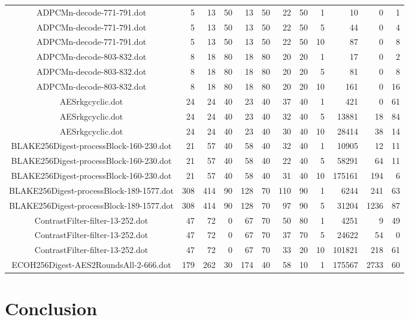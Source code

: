\documentclass[colorback,accentcolor=tud1c,11pt]{tudreport}
\begin{document}
\begin{landscape}
\begin{tabular}{ c | r | r | r | r | r | r | r | r | r | r | r }
   ADPCMn-decode-771-791.dot                &   5 &  13 & 50 &  13 & 50 &  22 & 50 &  1 &     10 &    0 &  1 \\
   ADPCMn-decode-771-791.dot                &   5 &  13 & 50 &  13 & 50 &  22 & 50 &  5 &     44 &    0 &  4 \\
   ADPCMn-decode-771-791.dot                &   5 &  13 & 50 &  13 & 50 &  22 & 50 & 10 &     87 &    0 &  8 \\
   ADPCMn-decode-803-832.dot                &   8 &  18 & 80 &  18 & 80 &  20 & 20 &  1 &     17 &    0 &  2 \\
   ADPCMn-decode-803-832.dot                &   8 &  18 & 80 &  18 & 80 &  20 & 20 &  5 &     81 &    0 &  8 \\
   ADPCMn-decode-803-832.dot                &   8 &  18 & 80 &  18 & 80 &  20 & 20 & 10 &    161 &    0 & 16 \\
   AESrkgcyclic.dot                         &  24 &  24 & 40 &  23 & 40 &  37 & 40 &  1 &    421 &    0 & 61 \\
   AESrkgcyclic.dot                         &  24 &  24 & 40 &  23 & 40 &  32 & 40 &  5 &  13881 &   18 & 84 \\
   AESrkgcyclic.dot                         &  24 &  24 & 40 &  23 & 40 &  30 & 40 & 10 &  28414 &   38 & 14 \\
   BLAKE256Digest-processBlock-160-230.dot  &  21 &  57 & 40 &  58 & 40 &  32 & 40 &  1 &  10905 &   12 & 11 \\
   BLAKE256Digest-processBlock-160-230.dot  &  21 &  57 & 40 &  58 & 40 &  22 & 40 &  5 &  58291 &   64 & 11 \\
   BLAKE256Digest-processBlock-160-230.dot  &  21 &  57 & 40 &  58 & 40 &  31 & 40 & 10 & 175161 &  194 &  6 \\
   BLAKE256Digest-processBlock-189-1577.dot & 308 & 414 & 90 & 128 & 70 & 110 & 90 &  1 &   6244 &  241 & 63 \\
   BLAKE256Digest-processBlock-189-1577.dot & 308 & 414 & 90 & 128 & 70 &  97 & 90 &  5 &  31204 & 1236 & 87 \\
   ContrastFilter-filter-13-252.dot         &  47 &  72 &  0 &  67 & 70 &  50 & 80 &  1 &   4251 &    9 & 49 \\
   ContrastFilter-filter-13-252.dot         &  47 &  72 &  0 &  67 & 70 &  37 & 70 &  5 &  24622 &   54 &  0 \\
   ContrastFilter-filter-13-252.dot         &  47 &  72 &  0 &  67 & 70 &  33 & 20 & 10 & 101821 &  218 & 61 \\
   ECOH256Digest-AES2RoundsAll-2-666.dot    & 179 & 262 & 30 & 174 & 40 &  58 & 10 &  1 & 175567 & 2733 & 60 \\
  \end{tabular}
 \end{landscape}
 


 
 \chapter{Conclusion}
 

%  
%  
\end{document}
